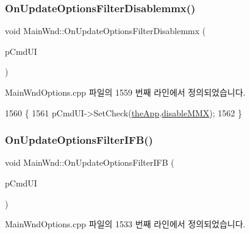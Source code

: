 \subsubsection{\texorpdfstring{On\+Update\+Options\+Filter\+Disablemmx()}{OnUpdateOptionsFilterDisablemmx()}}
{\footnotesize\ttfamily void Main\+Wnd\+::\+On\+Update\+Options\+Filter\+Disablemmx (\begin{DoxyParamCaption}\item[{C\+Cmd\+UI $\ast$}]{p\+Cmd\+UI }\end{DoxyParamCaption})\hspace{0.3cm}{\ttfamily [protected]}}



Main\+Wnd\+Options.\+cpp 파일의 1559 번째 라인에서 정의되었습니다.


\begin{DoxyCode}
1560 \{
1561   pCmdUI->SetCheck(\mbox{\hyperlink{_v_b_a_8cpp_a8095a9d06b37a7efe3723f3218ad8fb3}{theApp}}.\mbox{\hyperlink{class_v_b_a_ac417f46c467d0fcf095731620ca7de71}{disableMMX}});
1562 \}
\end{DoxyCode}
\mbox{\label{class_main_wnd_a526505f41dd67ef0c1971aa6825af564}} 
\subsubsection{\texorpdfstring{On\+Update\+Options\+Filter\+I\+F\+B()}{OnUpdateOptionsFilterIFB()}}
{\footnotesize\ttfamily void Main\+Wnd\+::\+On\+Update\+Options\+Filter\+I\+FB (\begin{DoxyParamCaption}\item[{C\+Cmd\+UI $\ast$}]{p\+Cmd\+UI }\end{DoxyParamCaption})}



Main\+Wnd\+Options.\+cpp 파일의 1533 번째 라인에서 정의되었습니다.


